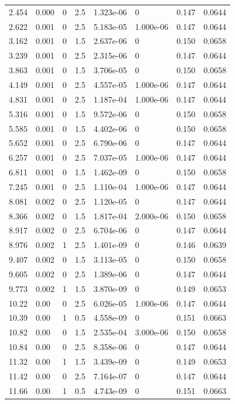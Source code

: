 \documentclass[preview]{standalone}
\begin{document}
{{\begin{tabular}{L{1.2cm}C{1.2cm} C{0.3cm}C{0.5cm} C{1.4cm}C{1.4cm} C{1.4cm}C{1.4cm}}
  2.454  &  0.000  & 0     & 2.5 &  1.323e-06  & 0  & 0.147 &  0.0644   \\ 
  2.622  &  0.001  & 0     & 2.5 &  5.183e-05  & 1.000e-06  & 0.147 &  0.0644   \\ 
  3.162  &  0.001  & 0     & 1.5 &  2.637e-06  & 0  & 0.150 &  0.0658   \\ 
  3.239  &  0.001  & 0     & 2.5 &  2.315e-06  & 0  & 0.147 &  0.0644   \\ 
  3.863  &  0.001  & 0     & 1.5 &  3.706e-05  & 0  & 0.150 &  0.0658   \\ 
  4.149  &  0.001  & 0     & 2.5 &  4.557e-05  & 1.000e-06  & 0.147 &  0.0644   \\ 
  4.831  &  0.001  & 0     & 2.5 &  1.187e-04  & 1.000e-06  & 0.147 &  0.0644   \\ 
  5.316  &  0.001  & 0     & 1.5 &  9.572e-06  & 0  & 0.150 &  0.0658   \\ 
  5.585  &  0.001  & 0     & 1.5 &  4.402e-06  & 0  & 0.150 &  0.0658   \\ 
  5.652  &  0.001  & 0     & 2.5 &  6.790e-06  & 0  & 0.147 &  0.0644   \\ 
  6.257  &  0.001  & 0     & 2.5 &  7.037e-05  & 1.000e-06  & 0.147 &  0.0644   \\ 
  6.811  &  0.001  & 0     & 1.5 &  1.462e-09  & 0  & 0.150 &  0.0658   \\ 
  7.245  &  0.001  & 0     & 2.5 &  1.110e-04  & 1.000e-06  & 0.147 &  0.0644   \\ 
  8.081  &  0.002  & 0     & 2.5 &  1.120e-05  & 0  & 0.147 &  0.0644   \\ 
  8.366  &  0.002  & 0     & 1.5 &  1.817e-04  & 2.000e-06  & 0.150 &  0.0658   \\ 
  8.917  &  0.002  & 0     & 2.5 &  6.704e-06  & 0  & 0.147 &  0.0644   \\ 
  8.976  &  0.002  & 1     & 2.5 &  1.401e-09  & 0  & 0.146 &  0.0639   \\ 
  9.407  &  0.002  & 0     & 1.5 &  3.113e-05  & 0  & 0.150 &  0.0658   \\ 
  9.605  &  0.002  & 0     & 2.5 &  1.389e-06  & 0  & 0.147 &  0.0644   \\ 
  9.773  &  0.002  & 1     & 1.5 &  3.870e-09  & 0  & 0.149 &  0.0653   \\ 
  10.22  &  0.00  & 0     & 2.5 &  6.026e-05  & 1.000e-06  & 0.147 &  0.0644   \\ 
  10.39  &  0.00  & 1     & 0.5 &  4.558e-09  & 0  & 0.151 &  0.0663   \\ 
  10.82  &  0.00  & 0     & 1.5 &  2.535e-04  & 3.000e-06  & 0.150 &  0.0658   \\ 
  10.84  &  0.00  & 0     & 2.5 &  8.358e-06  & 0  & 0.147 &  0.0644   \\ 
  11.32  &  0.00  & 1     & 1.5 &  3.439e-09  & 0  & 0.149 &  0.0653   \\ 
  11.42  &  0.00  & 0     & 2.5 &  7.164e-07  & 0  & 0.147 &  0.0644   \\ 
  11.66  &  0.00  & 1     & 0.5 &  4.743e-09  & 0  & 0.151 &  0.0663   \\ 
\hline 
\end{tabular} 

}}
\end{document}
